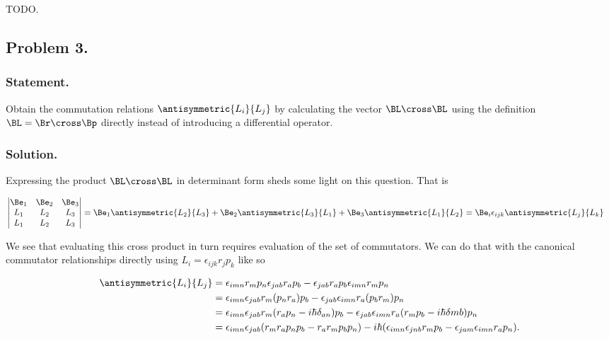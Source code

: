 TODO.
\subsection{Problem 3.}
\subsubsection{Statement.}

Obtain the commutation relations $\antisymmetric{L_i}{L_j}$ by calculating the vector $\BL \cross \BL$ using the definition $\BL = \Br \cross \Bp$ directly instead of introducing a differential operator.

\subsubsection{Solution.}

Expressing the product $\BL \cross \BL$ in determinant form sheds some light on this question.  That is

\begin{align}\label{eqn:desaiCh4:300}
\begin{vmatrix}
 \Be_1 & \Be_2 & \Be_3 \\
 L_1 & L_2 & L_3 \\
 L_1 & L_2 & L_3
\end{vmatrix}
&=
 \Be_1 \antisymmetric{L_2}{L_3}
 +\Be_2 \antisymmetric{L_3}{L_1}
 +\Be_3 \antisymmetric{L_1}{L_2}
= \Be_i \epsilon_{ijk} \antisymmetric{L_j}{L_k}
\end{align}

We see that evaluating this cross product in turn requires evaluation of the set of commutators.  We can do that with the canonical commutator relationships directly using $L_i = \epsilon_{ijk} r_j p_k$ like so

\begin{align*}
\antisymmetric{L_i}{L_j}
&=
\epsilon_{imn} r_m p_n \epsilon_{jab} r_a p_b
- \epsilon_{jab} r_a p_b \epsilon_{imn} r_m p_n \\
&=
\epsilon_{imn} \epsilon_{jab} r_m (p_n r_a) p_b
- \epsilon_{jab} \epsilon_{imn} r_a (p_b r_m) p_n \\
&=
\epsilon_{imn} \epsilon_{jab} r_m (r_a p_n -i \hbar \delta_{an}) p_b
- \epsilon_{jab} \epsilon_{imn} r_a (r_m p_b - i \hbar \delta{mb}) p_n \\
&=
\epsilon_{imn} \epsilon_{jab} (r_m r_a p_n p_b - r_a r_m p_b p_n )
- i \hbar ( \epsilon_{imn} \epsilon_{jnb} r_m p_b - \epsilon_{jam} \epsilon_{imn} r_a p_n ).
\end{align*}


